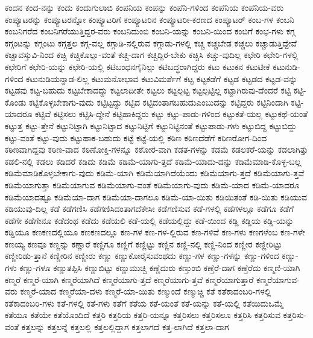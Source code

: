 {ಕಂದನ
ಕಂದ-ನನ್ನು
ಕಂದು
ಕಂದುಗುಲಾಬಿ
ಕಂಪನಿಯ
ಕಂಪನ್ನು
ಕಂಪೆನಿ-ಗಳಿಂದ
ಕಂಪೆನಿಯ
ಕಂಪೆನಿಯ-ವರು
ಕಂಪ್ಯೂಟರನ್ನು
ಕಂಪ್ಯೂಟರನ್ನೋ
ಕಂಪ್ಯೂಟರಿಗೆ
ಕಂಪ್ಯೂಟರಿನ
ಕಂಪ್ಯೂಟರೀ-ಕರಣದ
ಕಂಪ್ಯೂಟರ್
ಕಂಬ-ಗಳ
ಕಂಬನಿ
ಕಂಬನಿಗರೆದ
ಕಂಬನಿಗರೆಯುತ್ತಿದ್ದರ-ವರು
ಕಂಬನಿದುಂಬಿ
ಕಂಬನಿ-ಯನ್ನು
ಕಂಬನಿ-ಯಿಂದ
ಕಂಬಿಗೆ
ಕಂಭ-ಗಳು
ಕಗ್ಗ
ಕಗ್ಗಂಟನ್ನು
ಕಗ್ಗಂಟು
ಕಗ್ಗತ್ತಲ
ಕಗ್ಗ-ವಲ್ಲ
ಕಗ್ಗಾಡಿ-ನಲ್ಲಿರುವ
ಕಗ್ಗಾಡು-ಗಳಲ್ಲಿ
ಕಚ್ಚ
ಕಚ್ಚಬೇಡ
ಕಚ್ಚಲು
ಕಚ್ಚಾಡುತ್ತಿದ್ದೇವೆ
ಕಚ್ಚಾವಸ್ತುವಿ-ನಿಂದ
ಕಚ್ಚಿ
ಕಚ್ಚಿಕೊಲ್ಲು-ವಂತೆ
ಕಚ್ಚಿ-ದಾಗ
ಕಚ್ಚಿದ್ದಿರ-ಬೇಕು
ಕಚ್ಚಿಸಿ
ಕಚ್ಚು-ವುದಿಲ್ಲ
ಕಛೇರಿ
ಕಛೇರಿ-ಗಳಲ್ಲಿ
ಕಛೇರಿಗೆ
ಕಛೇರಿ-ಯನ್ನು
ಕಛೇರಿ-ಯಲ್ಲಿ
ಕಟಿಬಂಧನಗೈನಿಲ್ಲು
ಕಟಿಬದ್ಧರಾಗಿದ್ದರು
ಕಟು
ಕಟುಕನ
ಕಟುಟೀಕೆ
ಕಟುನುಡಿ-ಗಳಿಂದ
ಕಟುನುಡಿಯನ್ನಾಡ-ಲಿಲ್ಲ
ಕಟುಮನೋಭಾವ
ಕಟುವಿಮರ್ಶೆಗೆ
ಕಟ್ಟ
ಕಟ್ಟಕಡೆಗೆ
ಕಟ್ಟಡ
ಕಟ್ಟಡದ
ಕಟ್ಟಡ-ವನ್ನು
ಕಟ್ಟಡವು
ಕಟ್ಟ-ಬಹುದು
ಕಟ್ಟಬೇಕಾದದ್ದು
ಕಟ್ಟಲಾದೀತೇ
ಕಟ್ಟಲು
ಕಟ್ಟಲ್ಪಟ್ಟ
ಕಟ್ಟಲ್ಪಟ್ಟಿಲ್ಲ
ಕಟ್ಟಾಗಿರುವು-ದೆಂದರೆ
ಕಟ್ಟಿ
ಕಟ್ಟಿ-ಕೊಂಡು
ಕಟ್ಟಿಕೊಳ್ಳಬೇಕಾಗು-ವುದು
ಕಟ್ಟಿಟ್ಟದ್ದು
ಕಟ್ಟಿದ
ಕಟ್ಟಿದಂತಾಗಬಹುದುಎಂಬುದನ್ನು
ಕಟ್ಟಿದ್ದರು
ಕಟ್ಟಿನಿಂದಾಗಿ
ಕಟ್ಟಿ-ಯಾದರೂ
ಕಟ್ಟಿವೆ
ಕಟ್ಟಿಸಲು
ಕಟ್ಟಿಸಿ-ದ್ದೇನೆ
ಕಟ್ಟಿಹಾಕಿದ್ದರು
ಕಟ್ಟು
ಕಟ್ಟು-ಪಾಡು-ಗಳಿಂದ
ಕಟ್ಟುಕತೆ-ಯಲ್ಲ
ಕಟ್ಟುಕಥೆ-ಯಂತೆ
ಕಟ್ಟುತ್ತ
ಕಟ್ಟು-ತ್ತೇನೆ
ಕಟ್ಟುನಿಟ್ಟಾಗಿ
ಕಟ್ಟುನಿಟ್ಟಾದ
ಕಟ್ಟುನಿಟ್ಟಿಗೆ
ಕಟ್ಟುನಿಟ್ಟಿನಂತೆ
ಕಟ್ಟುಪಾಡು-ಗಳು
ಕಟ್ಟುಬಿದ್ದ
ಕಟ್ಟುಬಿದ್ದು
ಕಟ್ಟು-ವಂತೆ
ಕಟ್ಟು-ವುದು
ಕಟ್ಟುಹಾಕ-ಬಹುದು
ಕಟ್ಟೆ
ಕಟ್ಟೆ-ಯಲ್ಲಿ
ಕಠಿಣ
ಕಠಿಣದೆಡೆಗೆ
ಕಠಿಣರೋಗ-ದಿಂದ
ಕಠಿಣವಾಗಿದ್ದವು
ಕಠಿಣ-ವಾದ
ಕಠಿಣೋಕ್ತಿ-ಗಳನ್ನೂ
ಕಠೋರ-ವಾಗಿ
ಕಡತ-ಗಳನ್ನು
ಕಡಮೆ
ಕಡಲಕರೆ-ಯನ್ನು
ಕಡಲಾಗಿತ್ತು
ಕಡಲಿ-ನಲ್ಲಿ
ಕಡಲು
ಕಡಿದರೆ
ಕಡಿದು
ಕಡಿಮೆ
ಕಡಿಮೆ-ಯಾಗು-ತ್ತದೆ
ಕಡಿಮೆ-ಯಾದು-ದನ್ನು
ಕಡಿಮೆಮಾಡಿ-ಕೊಳ್ಳ-ಬಲ್ಲ
ಕಡಿಮೆಮಾಡಿಕೊಳ್ಳಬೇಕಾಗು-ವುದು
ಕಡಿಮೆ-ಯಾಗಿ
ಕಡಿಮೆಯಾಗಿದೆಯೆಂದು
ಕಡಿಮೆಯಾಗು-ತ್ತದೆ
ಕಡಿಮೆಯಾಗು-ತ್ತವೆ
ಕಡಿಮೆಯಾಗುತ್ತಾ
ಕಡಿಮೆಯಾಗುವ
ಕಡಿಮೆಯಾಗು-ವಂತೆ
ಕಡಿಮೆಯಾಗು-ವುದು
ಕಡಿಮೆ-ಯಾದ
ಕಡಿಮೆ-ಯಾದರೂ
ಕಡಿಮೆಯಾದಷ್ಟೂ
ಕಡಿಮೆಯಾ-ದಾಗ
ಕಡಿಮೆಯಾ-ದಾಗಲೂ
ಕಡಿಮೆ-ಯಾ-ಯಿತು
ಕಡಿಯಿತಂತೆ
ಕಡಿ-ಯಿತು
ಕಡಿಯುವ
ಕಡಿಯುವು-ದಿಲ್ಲ
ಕಡೆ
ಕಡೆಗಣಿಸಿ
ಕಡೆಗಣಿಸಿದಂತಾಗದೆಕೇಸೀ
ಕಡೆಗಣಿಸುವ
ಕಡೆ-ಗಳಲ್ಲಿ
ಕಡೆಗಳಲ್ಲೂ
ಕಡೆಗೂ
ಕಡೆಗೆ
ಕಡೆಗೇ
ಕಡೆಗೇನೂ
ಕಡೆದಂಥ
ಕಡೆದು
ಕಡೆಯಲಿ
ಕಡೆ-ಯಲ್ಲಿ
ಕಡೆಯಲ್ಲಿದ್ದು
ಕಡೆ-ಯಿಂದ
ಕಡ್ಡಿ
ಕಡ್ಡಿಯ
ಕಡ್ಡಿ-ಯನ್ನು
ಕಡ್ಡಿಯೂ
ಕಣಕಣದಲ್ಲಿಯೂ
ಕಣಕಣದಲ್ಲೂ
ಕಣ-ಗಳ
ಕಣ-ಗಳ-ಲ್ಲಿರುವ
ಕಣ-ಗಳಿವೆ
ಕಣ-ಗಳು
ಕಣಗಳೆಂಬ
ಕಣ-ಗಳೇ
ಕಣಯ್ಯ
ಕಣವೂ
ಕಣ್ಣನ್ನು
ಕಣ್ಣಾರೆ
ಕಣ್ಣಿಗೂ
ಕಣ್ಣಿಗೆ
ಕಣ್ಣಿಟ್ಟು
ಕಣ್ಣಿನ
ಕಣ್ಣಿ-ನಲ್ಲಿ
ಕಣ್ಣಿ-ನಿಂದ
ಕಣ್ಣೀರ
ಕಣ್ಣೀರಿಟ್ಟು
ಕಣ್ಣೀರಿಡು-ತ್ತಾನೆ
ಕಣ್ಣೀರಿನ
ಕಣ್ಣೀರು
ಕಣ್ಣು
ಕಣ್ಣುಕೋರೈಸುವಂಥದು
ಕಣ್ಣು-ಗಳ
ಕಣ್ಣು-ಗಳನ್ನು
ಕಣ್ಣು-ಗಳಿಂದ
ಕಣ್ಣು-ಗಳು
ಕಣ್ಣು-ಗಳೂ
ಕಣ್ಣುತಪ್ಪಿಸಿ
ಕಣ್ಣುಬಿಟ್ಟು
ಕಣ್ಣುಮುಚ್ಚಿ
ಕಣ್ಣೆದುರು
ಕಣ್ತುಂಬಿ
ಕಣ್ತೆರೆ-ದಾಗ
ಕಣ್ತೆರೆದು
ಕಣ್ಮಣಿ-ಯಾಗಿ
ಕಣ್ಮರೆ
ಕಣ್ಮರೆ-ಯಾಗಿ
ಕಣ್ಮರೆಯಾಗಿದೆ
ಕಣ್ಮರೆಯಾಗು-ತ್ತದೆ
ಕಣ್ಮರೆಯಾಗು-ತ್ತವೆ
ಕಣ್ಮರೆಯಾಗುತ್ತಾರೆ
ಕಣ್ಮರೆಯಾಗುವ-ವರು
ಕಣ್ಮರೆ-ಯಾದ
ಕಣ್ಮರೆಯಾ-ದಳು
ಕಣ್ಮರೆ-ಯಾ-ಯಿತು
ಕಣ್ಮುಂದೆ
ಕಣ್ಮುಚ್ಚಿ
ಕತೆ
ಕತೆಕಾದಂಬರಿ-ಗಳಲ್ಲಿ
ಕತೆಕಾದಂಬರಿ-ಗಳು
ಕತೆ-ಗಳಲ್ಲಿ
ಕತೆ-ಗಳು
ಕತೆಗೆ
ಕತೆಯ
ಕತೆ-ಯಂತೆ
ಕತೆ-ಯನ್ನು
ಕತೆ-ಯಲ್ಲಿ
ಕತೆಯಿದುಒಮ್ಮೆ
ಕತೆಯೂ
ಕತೆಯೇ
ಕತೆಯೊಂದಿದೆ
ಕತ್ತರಿ
ಕತ್ತರಿಯ
ಕತ್ತರಿ-ಯನ್ನೂ
ಕತ್ತರಿಸಲು
ಕತ್ತರಿಸಲೂ
ಕತ್ತರಿಸಿ
ಕತ್ತರಿಸುವ
ಕತ್ತರಿಸು-ವಂತೆ
ಕತ್ತಲನ್ನು
ಕತ್ತಲನ್ನೆ
ಕತ್ತಲಲ್ಲಿ
ಕತ್ತಲಲ್ಲಿದ್ದಾಗ
ಕತ್ತಲಾಗದೆ
ಕತ್ತ-ಲಾಗಿದೆ
ಕತ್ತಲಾ-ದಾಗ
}
